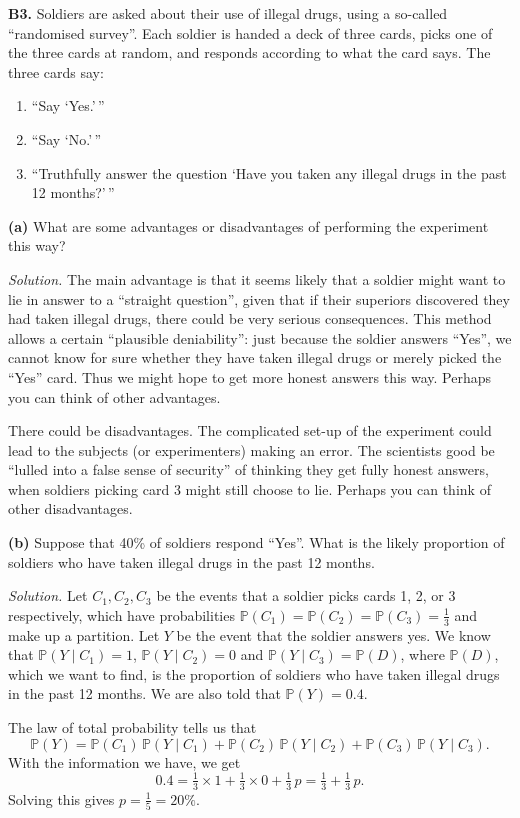 \documentclass[
  a4paper,
]{book}
\providecommand{\tightlist}{%
  \setlength{\itemsep}{0pt}\setlength{\parskip}{0pt}}
\theoremstyle{definition}
\theoremstyle{definition}
\theoremstyle{definition}
\theoremstyle{definition}
\theoremstyle{remark}
\begin{document}
\textbf{B3.} Soldiers are asked about their use of illegal drugs, using a so-called ``randomised survey''. Each soldier is handed a deck of three cards, picks one of the three cards at random, and responds according to what the card says. The three cards say:

\begin{enumerate}
\def\labelenumi{\arabic{enumi}.}
\tightlist
\item
  ``Say `Yes.'\,''
\item
  ``Say `No.'\,''
\item
  ``Truthfully answer the question `Have you taken any illegal drugs in the past 12 months?'\,''
\end{enumerate}

\textbf{(a)} What are some advantages or disadvantages of performing the experiment this way?

\begin{myanswers}
\emph{Solution.} The main advantage is that it seems likely that a soldier might want to lie in answer to a ``straight question'', given that if their superiors discovered they had taken illegal drugs, there could be very serious consequences. This method allows a certain ``plausible deniability'': just because the soldier answers ``Yes'', we cannot know for sure whether they have taken illegal drugs or merely picked the ``Yes'' card. Thus we might hope to get more honest answers this way. Perhaps you can think of other advantages.

There could be disadvantages. The complicated set-up of the experiment could lead to the subjects (or experimenters) making an error. The scientists good be ``lulled into a false sense of security'' of thinking they get fully honest answers, when soldiers picking card 3 might still choose to lie. Perhaps you can think of other disadvantages.

\end{myanswers}

\textbf{(b)} Suppose that 40\% of soldiers respond ``Yes''. What is the likely proportion of soldiers who have taken illegal drugs in the past 12 months.

\begin{myanswers}
\emph{Solution.}
Let \(C_1, C_2, C_3\) be the events that a soldier picks cards 1, 2, or 3 respectively, which have probabilities \(\mathbb P(C_1) = \mathbb P(C_2) = \mathbb P(C_3) = \frac13\) and make up a partition. Let \(Y\) be the event that the soldier answers yes. We know that \(\mathbb P(Y \mid C_1) = 1\), \(\mathbb P(Y \mid C_2) = 0\) and \(\mathbb P(Y \mid C_3) = \mathbb P(D)\), where \(\mathbb P(D)\), which we want to find, is the proportion of soldiers who have taken illegal drugs in the past 12 months. We are also told that \(\mathbb P(Y) = 0.4\).

The law of total probability tells us that
\[ \mathbb P(Y) = \mathbb P(C_1)\,\mathbb P(Y \mid C_1) + \mathbb P(C_2)\,\mathbb P(Y \mid C_2) + 
\mathbb P(C_3)\,\mathbb P(Y \mid C_3) .\]
With the information we have, we get
\[ 0.4 = \tfrac13 \times 1 + \tfrac13 \times 0 + \tfrac13 \, p = \tfrac13 + \tfrac13 \,p . \]
Solving this gives \(p = \frac15 = 20\%\).

\end{myanswers}
\end{document}
